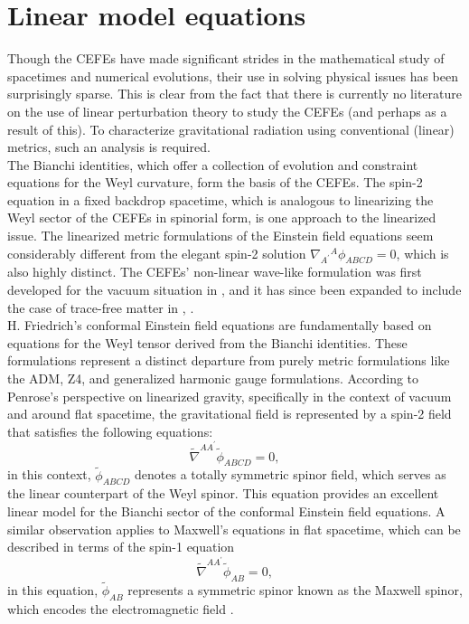 \section{Linear model equations}
\label{sec:LinearModelEquations}
Though the CEFEs have made significant strides in the mathematical study of spacetimes and numerical evolutions, their use in solving physical issues has been surprisingly sparse. This is clear from the fact that there is currently no literature on the use of linear perturbation theory to study the CEFEs (and perhaps as a result of this). To characterize gravitational radiation using conventional (linear) metrics, such an analysis is required. \\

The Bianchi identities, which offer a collection of evolution and constraint equations for the Weyl curvature, form the basis of the CEFEs. The spin-2 equation in a fixed backdrop spacetime, which is analogous to linearizing the Weyl sector of the CEFEs in spinorial form, is one approach to the linearized issue. The linearized metric formulations of the Einstein field equations seem considerably different from the elegant spin-2 solution $\nabla_{A^{\prime}}{ }^A \phi_{A B C D}=0$, which is also highly distinct. The CEFEs' non-linear wave-like formulation was first developed for the vacuum situation in \cite{Pae14}, and it has since been expanded to include the case of trace-free matter in \cite{CarHurKro19}, \cite{FenGas23}. \\

H. Friedrich's conformal Einstein field equations are fundamentally based on equations for the Weyl tensor derived from the Bianchi identities. These formulations represent a distinct departure from purely metric formulations like the ADM, Z4, and generalized harmonic gauge formulations. According to Penrose's perspective on linearized gravity, specifically in the context of vacuum and around flat spacetime, the gravitational field is represented by a spin-2 field that satisfies the following equations:
\begin{equation}\label{eq:Spin2Eq}
  \tilde{\nabla}^{A A^{\prime}} \tilde{\phi}_{A B C D}=0,
\end{equation}
in this context, $\tilde{\phi}_{A B C D}$ denotes a totally symmetric spinor field, which serves as the linear counterpart of the Weyl spinor.
This equation provides an excellent linear model for the Bianchi sector of the conformal Einstein field equations. A similar observation applies to Maxwell's equations in flat spacetime, which can be described in terms of the spin-1 equation
\begin{equation}\label{eq:Spin1Eq}
  \tilde{\nabla}^{A A^{\prime}} \tilde{\phi}_{A B}=0,
\end{equation}
in this equation, $\tilde{\phi}_{A B}$ represents a symmetric spinor known as the Maxwell spinor, which encodes the electromagnetic field \cite{GasPin23}. \\

